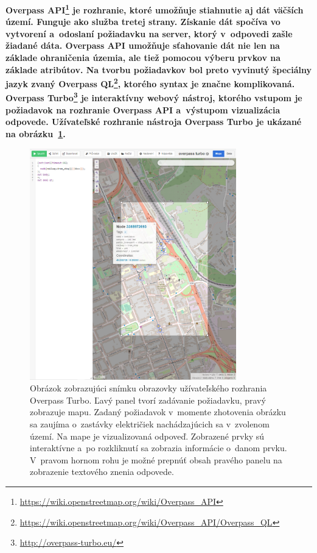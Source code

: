 \label{overpass_turbo}
\bf Overpass API\rm\footnote{\url{https://wiki.openstreetmap.org/wiki/Overpass_API}} je rozhranie, ktoré umožňuje stiahnutie aj dát väčších území. Funguje ako služba tretej strany. Získanie dát spočíva vo vytvorení a~odoslaní požiadavku na server, ktorý v~odpovedi zašle žiadané dáta. Overpass API umožňuje sťahovanie dát nie len na základe ohraničenia územia, ale tiež pomocou výberu prvkov na základe atribútov. Na tvorbu požiadavkov bol preto vyvinutý špeciálny jazyk zvaný \bf Overpass QL\rm\footnote{\url{https://wiki.openstreetmap.org/wiki/Overpass_API/Overpass_QL}}, ktorého syntax je značne komplikovaná. \bf Overpass Turbo\rm\footnote{\url{http://overpass-turbo.eu/}} je interaktívny webový nástroj, ktorého vstupom je požiadavok na rozhranie Overpass API a~výstupom vizualizácia odpovede. Užívateľské rozhranie nástroja Overpass Turbo je ukázané na obrázku~\ref{img_turbo}.

\begin{figure}[hbt]
	\centering
	\includegraphics[width=0.8\textwidth]{obrazky-figures/turbo.png}
	\caption{Obrázok zobrazujúci snímku obrazovky užívateľského rozhrania Overpass Turbo. Ľavý panel tvorí zadávanie požiadavku, pravý zobrazuje mapu. Zadaný požiadavok v~momente zhotovenia obrázku sa zaujíma o~zastávky električiek nachádzajúcich sa v~zvolenom území. Na mape je vizualizovaná odpoveď. Zobrazené prvky sú interaktívne a~po rozkliknutí sa zobrazia informácie o~danom prvku. V~pravom hornom rohu je možné prepnúť obsah pravého panelu na zobrazenie textového znenia odpovede.}
	\label{img_turbo}
\end{figure}

